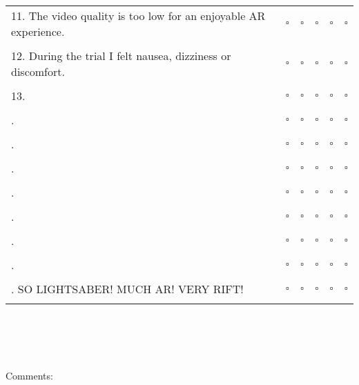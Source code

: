 \documentclass{article}
\begin{document}
{\begin{tabularx}{1\textwidth}{X S S S S S}
	11. The video quality is too low for an enjoyable AR experience.& $\square$ & $\square$ & $\square$ & $\square$ & $\square$\\\\
	12. During the trial I felt nausea, dizziness or discomfort.& $\square$ & $\square$ & $\square$ & $\square$ & $\square$\\\\
	13. & $\square$ & $\square$ & $\square$ & $\square$ & $\square$\\\\
	.& $\square$ & $\square$ & $\square$ & $\square$ & $\square$\\\\
	.& $\square$ & $\square$ & $\square$ & $\square$ & $\square$\\\\
	.& $\square$ & $\square$ & $\square$ & $\square$ & $\square$\\\\
	.& $\square$ & $\square$ & $\square$ & $\square$ & $\square$\\\\
	.& $\square$ & $\square$ & $\square$ & $\square$ & $\square$\\\\
	.& $\square$ & $\square$ & $\square$ & $\square$ & $\square$\\\\
	.& $\square$ & $\square$ & $\square$ & $\square$ & $\square$\\\\
	. SO LIGHTSABER! MUCH AR! VERY RIFT!& $\square$ & $\square$ & $\square$ & $\square$ & $\square$\\\\
\end{tabularx}%
}
\\
\\
\\
\\
Comments:
\end{document}
